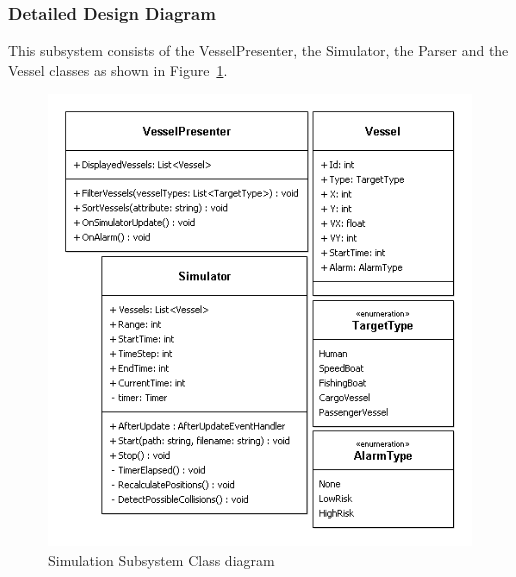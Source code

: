 \documentclass[12pt]{article}
\begin{document}
\subsubsection{Detailed Design Diagram}
This subsystem consists of the VesselPresenter, the Simulator, the Parser and the Vessel classes as shown in Figure~\ref{fig:SimulationSubsystemClassDiagram}.  
\begin{figure}[h!]
    \centering
    \includegraphics[scale=1]{3_3_1_simulationsubsystem}
    \caption{Simulation Subsystem Class diagram}
    \label{fig:SimulationSubsystemClassDiagram}
\end{figure}
\clearpage
\end{document}
